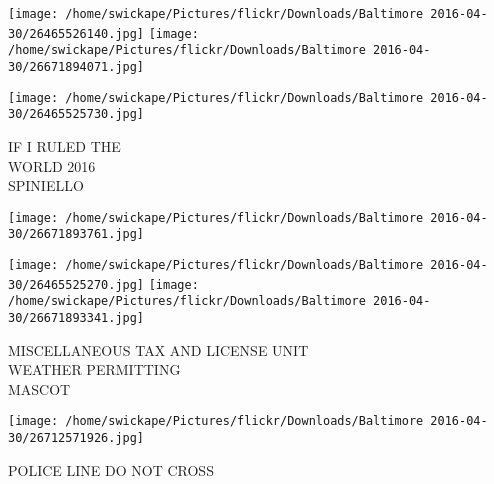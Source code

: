 \documentclass[10pt,letterpaper]{article}
\begin{document}
\texttt{[image: /home/swickape/Pictures/flickr/Downloads/Baltimore 2016-04-30/26465526140.jpg]}
\texttt{[image: /home/swickape/Pictures/flickr/Downloads/Baltimore 2016-04-30/26671894071.jpg]}

\texttt{[image: /home/swickape/Pictures/flickr/Downloads/Baltimore 2016-04-30/26465525730.jpg]}

IF I RULED THE\\
WORLD 2016\\
SPINIELLO\\
\pagebreak

\texttt{[image: /home/swickape/Pictures/flickr/Downloads/Baltimore 2016-04-30/26671893761.jpg]}

\vspace{0.25in}
\texttt{[image: /home/swickape/Pictures/flickr/Downloads/Baltimore 2016-04-30/26465525270.jpg]}
\texttt{[image: /home/swickape/Pictures/flickr/Downloads/Baltimore 2016-04-30/26671893341.jpg]}

MISCELLANEOUS TAX AND LICENSE UNIT\\
WEATHER PERMITTING\\
MASCOT\\
\pagebreak

\texttt{[image: /home/swickape/Pictures/flickr/Downloads/Baltimore 2016-04-30/26712571926.jpg]}

POLICE LINE DO NOT CROSS\\
\pagebreak
\end{document}
